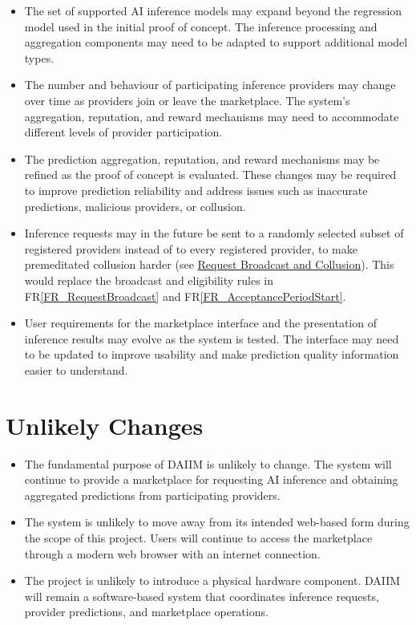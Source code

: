\documentclass[12pt]{article}
\newcommand{\rref}[1]{FR\ref{#1}}
\newcounter{lcnum} %
\begin{document}
\noindent \begin{itemize}
\item[LC\refstepcounter{lcnum}\thelcnum\label{LC_inferenceModels}:] The set of supported AI inference models may expand beyond the regression model used in the initial proof of concept. The inference processing and aggregation components may need to be adapted to support additional model types.
\item[LC\refstepcounter{lcnum}\thelcnum\label{LC_providerParticipation}:] The number and behaviour of participating inference providers may change over time as providers join or leave the marketplace. The system's aggregation, reputation, and reward mechanisms may need to accommodate different levels of provider participation.
\item[LC\refstepcounter{lcnum}\thelcnum\label{LC_aggregation}:] The prediction aggregation, reputation, and reward mechanisms may be refined as the proof of concept is evaluated. These changes may be required to improve prediction reliability and address issues such as inaccurate predictions, malicious providers, or collusion.
\item[LC\refstepcounter{lcnum}\thelcnum\label{LC_randomInvitations}:] Inference requests may in the future be sent to a randomly selected subset of registered providers instead of to every registered provider, to make premeditated collusion harder (see \hyperref[sec_RationaleBroadcast]{Request Broadcast and Collusion}). This would replace the broadcast and eligibility rules in \rref{FR_RequestBroadcast} and \rref{FR_AcceptancePeriodStart}.
\item[LC\refstepcounter{lcnum}\thelcnum\label{LC_userRequirements}:] User requirements for the marketplace interface and the presentation of inference results may evolve as the system is tested. The interface may need to be updated to improve usability and make prediction quality information easier to understand.
\end{itemize}


\section{Unlikely Changes}    

\noindent \begin{itemize}
\item[LC\refstepcounter{lcnum}\thelcnum\label{LC_corePurpose}:] The fundamental purpose of DAIIM is unlikely to change. The system will continue to provide a marketplace for requesting AI inference and obtaining aggregated predictions from participating providers.
\item[LC\refstepcounter{lcnum}\thelcnum\label{LC_softwarePlatform}:] The system is unlikely to move away from its intended web-based form during the scope of this project. Users will continue to access the marketplace through a modern web browser with an internet connection.
\item[LC\refstepcounter{lcnum}\thelcnum\label{LC_softwareOnly}:] The project is unlikely to introduce a physical hardware component. DAIIM will remain a software-based system that coordinates inference requests, provider predictions, and marketplace operations.
\end{itemize}
\end{document}
